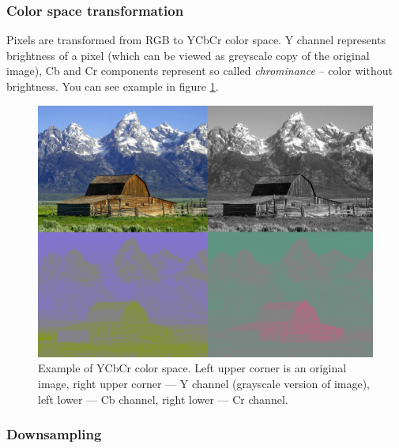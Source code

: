 \subsubsection{Color space transformation}

Pixels are transformed from RGB to YCbCr color space. Y channel represents
brightness of a pixel ({which can be viewed as greyscale copy of the original image}),
Cb and Cr components represent so called \textit{chrominance} -- color without brightness. 
You can see example in figure \ref{img:YCbCr}.


\begin{figure}
\centerline{\includegraphics[height=0.4\textheight]{images/Barns_grand_tetons_YCbCr_separation_quad.jpg}}
\caption[Example of YCbCr color space (Public domain) (source: \protect\url{https://en.wikipedia.org/wiki/File:Barns_grand_tetons_YCbCr_separation.jpg})]{Example of YCbCr color space. 
Left upper corner is an original image,
right upper corner --- Y channel (grayscale version of image),
left lower --- Cb channel,
right lower --- Cr channel.}
\label{img:YCbCr}
\end{figure}

\subsubsection{Downsampling}

